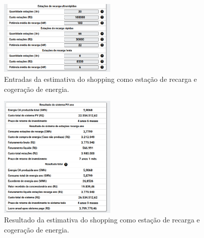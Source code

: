 \documentclass{beamer}
\begin{document}
\begin{frame}

\begin{figure}[H]
    \centering
    \includegraphics[width=0.5\textwidth]{./Figuras/shopping_5_2.png}
    \caption{Entradas da estimativa do shopping como estação de recarga e cogeração de energia.}
   \label{fig:shopping_5_2}
\end{figure}


\end{frame}

\begin{frame}


\begin{figure}[H]
    \centering
    \includegraphics[width=0.5\textwidth]{./Figuras/shopping_6.png}
    \caption{Resultado da estimativa do shopping como estação de recarga e cogeração de energia.}
   \label{fig:shopping_6}
\end{figure}

\end{frame}
\end{document}
